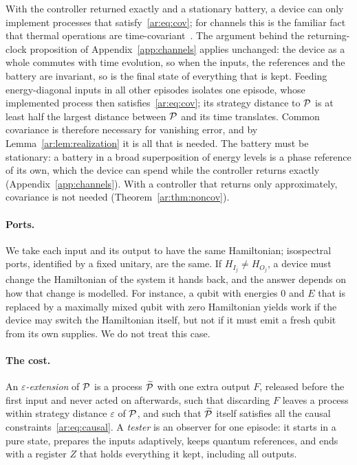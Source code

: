 \begin{remark}\label{ar:rem:cov}
With the controller returned exactly and a stationary battery, a device can only implement processes that satisfy~\eqref{ar:eq:cov}; for channels this is the familiar fact that thermal operations are time-covariant~\cite[Sec.~3]{FBB21}. The argument behind the returning-clock proposition of Appendix~\ref{app:channels} applies unchanged: the device as a whole commutes with time evolution, so when the inputs, the references and the battery are invariant, so is the final state of everything that is kept. Feeding energy-diagonal inputs in all other episodes isolates one episode, whose implemented process then satisfies~\eqref{ar:eq:cov}; its strategy distance to $\mathcal P$ is at least half the largest distance between $\mathcal P$ and its time translates. Common covariance is therefore necessary for vanishing error, and by Lemma~\ref{ar:lem:realization} it is all that is needed. The battery must be stationary: a battery in a broad superposition of energy levels is a phase reference of its own, which the device can spend while the controller returns exactly (Appendix~\ref{app:channels}). With a controller that returns only approximately, covariance is not needed (Theorem~\ref{ar:thm:noncov}).
\end{remark}

\paragraph{Ports.} We take each input and its output to have the same Hamiltonian; isospectral ports, identified by a fixed unitary, are the same. If $H_{I_j}\ne H_{O_j}$, a device must change the Hamiltonian of the system it hands back, and the answer depends on how that change is modelled. For instance, a qubit with energies $0$ and $E$ that is replaced by a maximally mixed qubit with zero Hamiltonian yields work if the device may switch the Hamiltonian itself, but not if it must emit a fresh qubit from its own supplies. We do not treat this case.

\paragraph{The cost.} An \emph{$\varepsilon$-extension} of $\mathcal P$ is a process $\widetilde{\mathcal P}$ with one extra output $F$, released before the first input and never acted on afterwards, such that discarding $F$ leaves a process within strategy distance $\varepsilon$ of $\mathcal P$, and such that $\widetilde{\mathcal P}$ itself satisfies all the causal constraints~\eqref{ar:eq:causal}. A \emph{tester} is an observer for one episode: it starts in a pure state, prepares the inputs adaptively, keeps quantum references, and ends with a register $Z$ that holds everything it kept, including all outputs.

